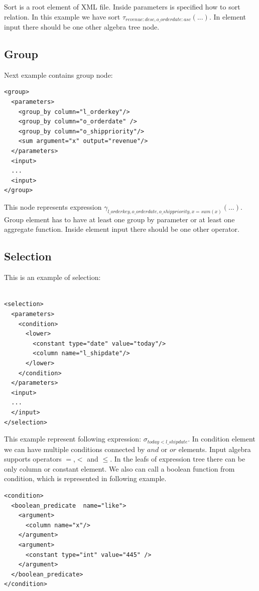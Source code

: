 Sort is a root element of XML file. Inside parameters is specified how to sort relation. In this example we have sort $\tau_{revenue:desc,o\_orderdate:asc}(...)$. In element input there should be one other algebra tree node.

\subsection{Group}

Next example contains group node:

\begin{lstlisting}
<group>
  <parameters>
    <group_by column="l_orderkey"/>
    <group_by column="o_orderdate" />
    <group_by column="o_shippriority"/>
    <sum argument="x" output="revenue"/>
  </parameters>
  <input>
  ...
  <input>
</group>
\end{lstlisting}

This node represents expression $\gamma_{l\_orderkey,o\_orderdate,o\_shippriority,x=sum(x)}(...)$. Group element has to have at least one group by parameter or at least one aggregate function. Inside element input there should be one other operator.

\subsection{Selection}

This is an example of selection:

\begin{lstlisting}

<selection>
  <parameters>
    <condition>
      <lower>
        <constant type="date" value="today"/>
        <column name="l_shipdate"/>
      </lower>
    </condition>
  </parameters>
  <input>
  ...
  </input>
</selection>
\end{lstlisting}
This example represent following expression: $\sigma_{today<l\_shipdate}$. In condition element we can have multiple conditions connected by $and$ or $or$ elements. Input algebra supports operators $=$,$<$ and $\leq$. In the leafs of expression tree there can be only column or constant element. We also can call a boolean function from condition, which is represented in following example.

\begin{lstlisting}
<condition>
  <boolean_predicate  name="like">
    <argument>
      <column name="x"/>
    </argument>
    <argument>
      <constant type="int" value="445" />
    </argument>
  </boolean_predicate>
</condition>
\end{lstlisting}

